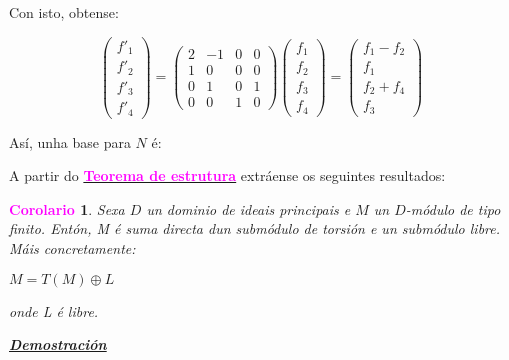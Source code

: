 \documentclass[twoside]{report}
\newcommand{\magbf}[1]{\textcolor{magenta}{\textbf{#1}}} %
\theoremstyle{mystyle}
\newtheorem{cor}{\magbf{Corolario}}[chapter]
\newenvironment{corollary}
{\begin{mdframed}[linecolor = magenta,backgroundcolor = classicrose, linewidth = 2mm]\begin{cor}}
{\end{cor}\end{mdframed}}
\begin{document}
\vspace{3mm}

\noindent Con isto, obtense:

\[
\begin{pmatrix}
f'_{1}\\
f'_{2}\\
f'_{3}\\
f'_{4}
\end{pmatrix}
=
\begin{pmatrix}
2 & -1 & 0 & 0\\
1 & 0 & 0 & 0\\
0 & 1 & 0 & 1\\
0 & 0 & 1 & 0
\end{pmatrix}
\begin{pmatrix}
f_{1}\\
f_{2}\\
f_{3}\\
f_{4}
\end{pmatrix}
=
\begin{pmatrix}
f_{1} - f_{2}\\
f_{1}\\
f_{2} + f_{4}\\
f_{3}
\end{pmatrix}
\]

\vspace{3mm}

\noindent Así, unha base para $N$ é:

\begin{center}
\end{center}

\vspace{10mm}

\noindent A partir do \hyperref[th4.2]{\magbf{Teorema de estrutura}} extráense os seguintes resultados:\\

\begin{corollary} \label{cor4.1}
Sexa $D$ un dominio de ideais principais e $M$ un $D$-módulo de tipo finito. Entón, M é suma directa dun submódulo de torsión e un submódulo libre. Máis concretamente:
\begin{center}
    $M = T(M) \oplus L$
\end{center}
onde L é libre.
\end{corollary}

\vspace{2mm}

\noindent \textbf{\textit{\underline{Demostración}}}
\end{document}
